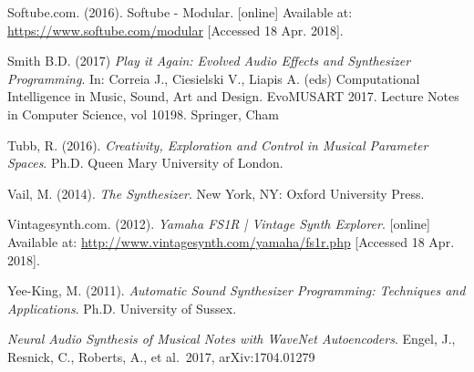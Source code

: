 \documentclass[11pt, oneside]{report}   	%
\begin{document}
\begin{thebibliography}{9}
Softube.com. (2016). Softube - Modular. [online] Available at: \url{https://www.softube.com/modular} [Accessed 18 Apr. 2018].

Smith B.D. (2017) \emph{Play it Again: Evolved Audio Effects and Synthesizer Programming}. In: Correia J., Ciesielski V., Liapis A. (eds) Computational Intelligence in Music, Sound, Art and Design. EvoMUSART 2017. Lecture Notes in Computer Science, vol 10198. Springer, Cham

Tubb, R. (2016). \emph{Creativity, Exploration and Control in Musical Parameter Spaces}. Ph.D. Queen Mary University of London.

Vail, M. (2014). \emph{The Synthesizer}. New York, NY: Oxford University Press.

Vintagesynth.com. (2012). \emph{Yamaha FS1R | Vintage Synth Explorer}. [online] Available at: \url{http://www.vintagesynth.com/yamaha/fs1r.php} [Accessed 18 Apr. 2018].

Yee-King, M. (2011). \emph{Automatic Sound Synthesizer Programming: Techniques and Applications}. Ph.D. University of Sussex.

 \emph{Neural Audio Synthesis of Musical Notes with WaveNet Autoencoders}. Engel, J., Resnick, C., Roberts, A., et al.\ 2017, arXiv:1704.01279 

\end{thebibliography}
\end{document}
